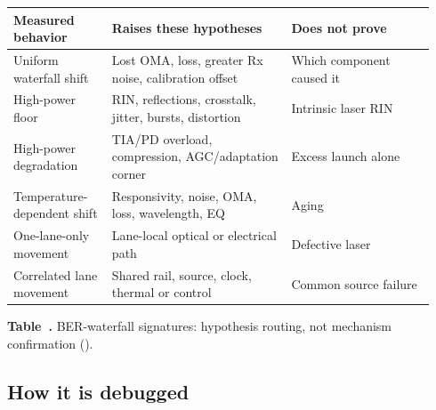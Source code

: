 \begin{table}[ht]
\label{tab:ber-curve-shape}%
\centering
\setlength{\tabcolsep}{3pt}%
\footnotesize
\renewcommand{\arraystretch}{1.2}%
\begin{tabular}{@{}p{0.22\linewidth}p{0.40\linewidth}p{0.32\linewidth}@{}}
\toprule
Measured behavior & Raises these hypotheses & Does not prove \\
\midrule
Uniform waterfall shift & Lost OMA, loss, greater Rx noise, calibration offset & Which component caused it \\
\addlinespace[0.8em]
High-power floor & RIN, reflections, crosstalk, jitter, bursts, distortion & Intrinsic laser RIN \\
\addlinespace[0.8em]
High-power degradation & TIA/PD overload, compression, AGC/adaptation corner & Excess launch alone \\
\addlinespace[0.8em]
Temperature-dependent shift & Responsivity, noise, OMA, loss, wavelength, EQ & Aging \\
\addlinespace[0.8em]
One-lane-only movement & Lane-local optical or electrical path & Defective laser \\
\addlinespace[0.8em]
Correlated lane movement & Shared rail, source, clock, thermal or control & Common source failure \\
\bottomrule
\end{tabular}
\par\medskip
{\raggedright\footnotesize\textbf{Table~\thetable.} BER-waterfall signatures:
hypothesis routing, not mechanism confirmation
().\par}
\end{table}


\subsection{How it is debugged}
\label{sec:models-how-debugged}

